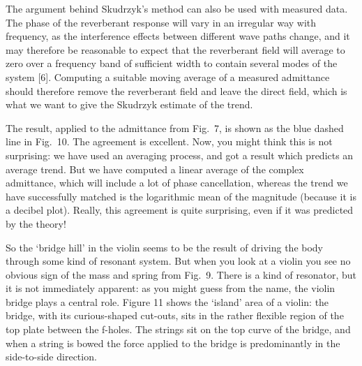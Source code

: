   The argument behind Skudrzyk's method can also be used with measured data. 
  The phase of the reverberant response will vary in an irregular way with 
  frequency, as the interference effects between different wave paths change, 
  and it may therefore be reasonable to expect that the reverberant field will 
  average to zero over a frequency band of sufficient width to contain several 
  modes of the system [6]. Computing a suitable moving average of a measured 
  admittance should therefore remove the reverberant field and leave the direct 
  field, which is what we want to give the Skudrzyk estimate of the trend. 

  The result, applied to the admittance from Fig.\ 7, is shown as the blue 
  dashed line in Fig.\ 10. The agreement is excellent. Now, you might think 
  this is not surprising: we have used an averaging process, and got a result 
  which predicts an average trend. But we have computed a linear average of the 
  complex admittance, which will include a lot of phase cancellation, whereas 
  the trend we have successfully matched is the logarithmic mean of the 
  magnitude (because it is a decibel plot). Really, this agreement is quite 
  surprising, even if it was predicted by the theory! 


  So the `bridge hill' in the violin seems to be the result of driving the body 
  through some kind of resonant system. But when you look at a violin you see 
  no obvious sign of the mass and spring from Fig.\ 9. There is a kind of 
  resonator, but it is not immediately apparent: as you might guess from the 
  name, the violin bridge plays a central role. Figure 11 shows the `island' 
  area of a violin: the bridge, with its curious-shaped cut-outs, sits in the 
  rather flexible region of the top plate between the f-holes. The strings sit 
  on the top curve of the bridge, and when a string is bowed the force applied 
  to the bridge is predominantly in the side-to-side direction. 


